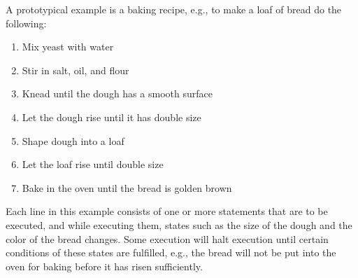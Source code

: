 A prototypical example is a baking recipe, e.g., to make a loaf of bread do the following:
\begin{enumerate}
\item Mix yeast with water 
\item Stir in salt, oil, and flour 
\item Knead until the dough has a smooth surface 
\item Let the dough rise until it has double size 
\item Shape dough into a loaf 
\item Let the loaf rise until double size 
\item Bake in the oven until the bread is golden brown
\end{enumerate}
Each line in this example consists of one or more statements that are to be executed, and while executing them, states such as the size of the dough and the color of the bread changes. Some execution will halt execution until certain conditions of these states are fulfilled, e.g., the bread will not be put into the oven for baking before it has risen sufficiently.

